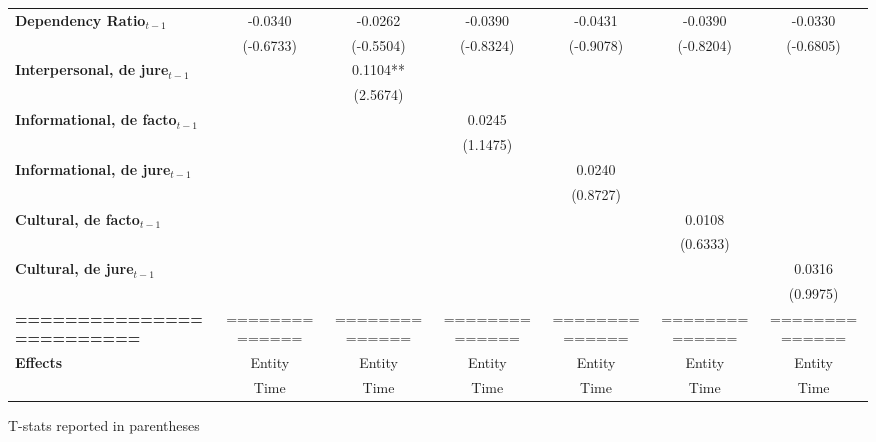 \begin{center}
\begin{tabular}{lcccccc}
\textbf{Dependency Ratio$_{t-1}$}   &      -0.0340       &      -0.0262       &      -0.0390       &      -0.0431       &      -0.0390       &      -0.0330        \\
\textbf{ }                         &     (-0.6733)      &     (-0.5504)      &     (-0.8324)      &     (-0.9078)      &     (-0.8204)      &     (-0.6805)       \\
\textbf{Interpersonal, de jure$_{t-1}$}           &                    &      0.1104**      &                    &                    &                    &                     \\
\textbf{ }                         &                    &      (2.5674)      &                    &                    &                    &                     \\
\textbf{Informational, de facto$_{t-1}$}           &                    &                    &       0.0245       &                    &                    &                     \\
\textbf{ }                         &                    &                    &      (1.1475)      &                    &                    &                     \\
\textbf{Informational, de jure$_{t-1}$}           &                    &                    &                    &       0.0240       &                    &                     \\
\textbf{ }                         &                    &                    &                    &      (0.8727)      &                    &                     \\
\textbf{Cultural, de facto$_{t-1}$}           &                    &                    &                    &                    &       0.0108       &                     \\
\textbf{ }                         &                    &                    &                    &                    &      (0.6333)      &                     \\
\textbf{Cultural, de jure$_{t-1}$}           &                    &                    &                    &                    &                    &       0.0316        \\
\textbf{ }                         &                    &                    &                    &                    &                    &      (0.9975)       \\
\textbf{=========================} &   ==============   &   ==============   &   ==============   &   ==============   &   ==============   &   ==============    \\
\textbf{Effects}                   &       Entity       &       Entity       &       Entity       &       Entity       &       Entity       &       Entity        \\
\textbf{}                          &        Time        &        Time        &        Time        &        Time        &        Time        &        Time         \\
\bottomrule
\end{tabular}
\end{center}

T-stats reported in parentheses